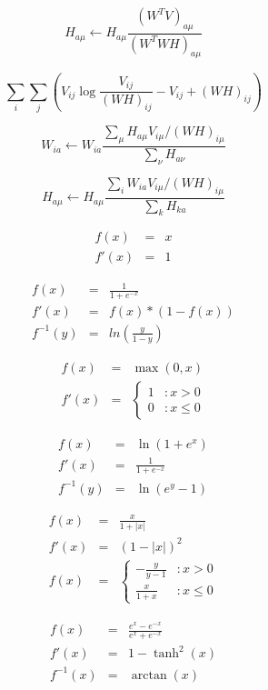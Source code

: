 \documentclass{article}
\begin{document}
\[ H_{a\mu} \leftarrow H_{a\mu} \frac{(W^T V)_{a\mu}}{(W^T WH)_{a\mu}} \]
\pagebreak

\[ \sum_i \sum_j (V_{ij} \log\frac{V_{ij}}{(W H)_{ij}} - V_{ij} + (W H)_{ij}) \]
\pagebreak

\[ W_{ia} \leftarrow W_{ia} \frac{\sum_{\mu} H_{a\mu} V_{i\mu} / (W H)_{i\mu}} {\sum_{\nu} H_{a\nu}} \]
\pagebreak

\[ H_{a\mu} \leftarrow H_{a\mu} \frac{\sum_{i} W_{ia} V_{i\mu}/(WH)_{i\mu}} {\sum_{k} H_{ka}} \]
\pagebreak

\begin{eqnarray*} f(x) &=& x \\ f'(x) &=& 1 \end{eqnarray*}
\pagebreak

\begin{eqnarray*} f(x) &=& \frac{1}{1 + e^{-x}} \\ f'(x) &=& f(x) * (1 - f(x)) \\ f^{-1}(y) &=& ln(\frac{y}{1-y}) \end{eqnarray*}
\pagebreak

\begin{eqnarray*} f(x) &=& \max(0, x) \\ f'(x) &=& \left\{ \begin{array}{lr} 1 & : x > 0 \\ 0 & : x \le 0 \end{array} \right. \end{eqnarray*}
\pagebreak

\begin{eqnarray*} f(x) &=& \ln(1 + e^{x}) \\ f'(x) &=& \frac{1}{1 + e^{-x}} \\ f^{-1}(y) &=& \ln(e^{y} - 1) \end{eqnarray*}
\pagebreak

\begin{eqnarray*} f(x) &=& \frac{x}{1 + |x|} \\ f'(x) &=& (1 - |x|)^2 \\ f(x) &=& \left\{ \begin{array}{lr} -\frac{y}{y-1} & : x > 0 \\ \frac{x}{1 + x} & : x \le 0 \end{array} \right. \end{eqnarray*}
\pagebreak

\begin{eqnarray*} f(x) &=& \frac{e^x - e^{-x}}{e^x + e^{-x}} \\ f'(x) &=& 1 - \tanh^2(x) \\ f^{-1}(x) &=& \arctan(x) \end{eqnarray*}
\pagebreak
\end{document}
